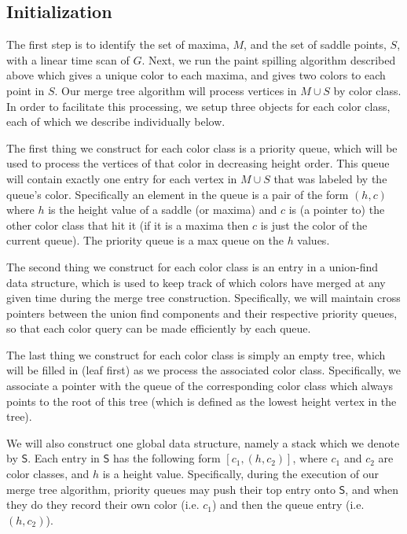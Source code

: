 \documentclass[A4paper,11pt]{article}
\newcommand{\stack}{\mathsf{S}}
\begin{document}
\subsection{Initialization}
The first step is to identify the set of maxima, $M$, and the set of saddle points, $S$, with a linear time scan of $G$.  Next, we run the paint spilling algorithm described above which gives a unique color to each maxima, and gives two colors to each point in $S$.  Our merge tree algorithm will process vertices in $M\cup S$ by color class.  In order to facilitate this processing, we setup three objects for each color class, each of which we describe individually below.

The first thing we construct for each color class is a priority queue, which will be used to process the vertices of that color in decreasing height order.  This queue will contain exactly one entry for each vertex in $M\cup S$ that was labeled by the queue's color.  
Specifically an element in the queue is a pair of the form $(h,c)$ where $h$ is the height value of a saddle (or maxima) and $c$ is (a pointer to) the other color class that hit it (if it is a maxima then $c$ is just the color of the current queue).  The priority queue is a max queue on the $h$ values.

The second thing we construct for each color class is an entry in a union-find data structure, which is used to keep track of which colors have merged at any given time during the merge tree construction.  Specifically, we will maintain cross pointers between the union find components and their respective priority queues, so that each color query can be made efficiently by each queue.

The last thing we construct for each color class is simply an empty tree, which will be filled in (leaf first) as we process the associated color class.  Specifically, we associate a pointer with the queue of the corresponding color class which always points to the root of this tree (which is defined as the lowest height vertex in the tree). 

We will also construct one global data structure, namely a stack which we denote by $\stack$.  Each entry in $\stack$ has the following form $[c_1, (h, c_2)]$, where $c_1$ and $c_2$ are color classes, and $h$ is a height value.  Specifically, during the execution of our merge tree algorithm, priority queues may push their top entry onto $\stack$, and when they do they record their own color (i.e. $c_1$) and then the queue entry (i.e. $(h, c_2)$).
\end{document}
